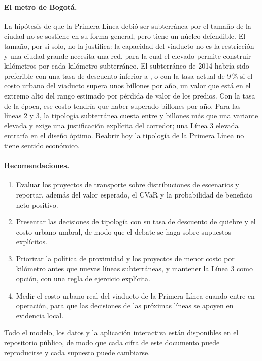 \paragraph{El metro de Bogotá.} La hipótesis de que la Primera Línea debió ser subterránea por el tamaño
de la ciudad no se sostiene en su forma general, pero tiene un núcleo defendible. El tamaño, por sí
solo, no la justifica: la capacidad del viaducto no es la restricción y una ciudad grande necesita una
red, para la cual el elevado permite construir \KmPorKm{} kilómetros por cada kilómetro subterráneo.
El subterráneo de 2014 habría sido preferible con una tasa de descuento inferior a \TasaEmpate{}, o con
la tasa actual de 9\,\% si el costo urbano del viaducto supera unos \UmbralOfNueve{} billones por año,
un valor que está en el extremo alto del rango estimado por pérdida de valor de los predios. Con la tasa
de la época, ese costo tendría que haber superado \UmbralOfDoce{} billones por año. Para las líneas 2 y
3, la tipología subterránea cuesta entre \AhorroLdos{} y \AhorroLtres{} billones más que una variante
elevada y exige una justificación explícita del corredor; una Línea 3 elevada entraría en el diseño
óptimo. Reabrir hoy la tipología de la Primera Línea no tiene sentido económico.

\paragraph{Recomendaciones.}
\begin{enumerate}[nosep]
\item Evaluar los proyectos de transporte sobre distribuciones de escenarios y reportar, además del
      valor esperado, el CVaR y la probabilidad de beneficio neto positivo.
\item Presentar las decisiones de tipología con su tasa de descuento de quiebre y el costo urbano
      umbral, de modo que el debate se haga sobre supuestos explícitos.
\item Priorizar la política de proximidad y los proyectos de menor costo por kilómetro antes que nuevas
      líneas subterráneas, y mantener la Línea 3 como opción, con una regla de ejercicio explícita.
\item Medir el costo urbano real del viaducto de la Primera Línea cuando entre en operación, para que
      las decisiones de las próximas líneas se apoyen en evidencia local.
\end{enumerate}

Todo el modelo, los datos y la aplicación interactiva están disponibles en el repositorio público, de
modo que cada cifra de este documento puede reproducirse y cada supuesto puede cambiarse.
